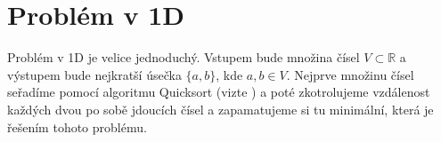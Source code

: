 \chapter{Problém v 1D}
\label{chap:problem_1D}
Problém v 1D je velice jednoduchý. Vstupem bude množina čísel $V \subset \mathbb{R}$ a výstupem bude nejkratší úsečka $\{a, b\}$, kde $ a, b \in V$. Nejprve množinu čísel seřadíme pomocí algoritmu Quicksort (vizte \autocite{10.1093/comjnl/5.1.10}) a poté zkotrolujeme vzdálenost každých dvou po sobě jdoucích čísel a zapamatujeme si tu minimální, která je řešením tohoto problému.

